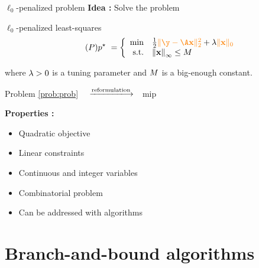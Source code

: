 \documentclass[10pt]{beamer}
\begin{document}
\begin{frame}{$\ell_0$-penalized problem}
  \textbf{Idea :} Solve the problem
  \begin{block}{$\ell_0$-penalized least-squares}
    \begin{equation}
      \label{prob:prob} \tag{\(\mpb\)}
      \optobj \ =
      \left\{
      \begin{array}{rl}
        \min & \tfrac{1}{2} \emphone{\norm{\obs-\dic\pv}{2}^2} + \reg \emphone{\norm{\pv}{0}}\\
        \text{s.t.} & \kvvbar{\pv}_{\infty} \leq \bigM
      \end{array}
      \right.
    \end{equation}
  \end{block}
  where $\lambda > 0$ is a tuning parameter and $M$ is a big-enough constant.

  \pause

  \begin{center}
    Problem \eqref{prob:prob} $\quad \xlongrightarrow{\text{reformulation}} \quad$\glsdesc{mip}
  \end{center}

  \pause

  \textbf{Properties :}
  \begin{itemize}
    \item Quadratic objective
    \item Linear constraints
    \item Continuous and integer variables
    \item Combinatorial problem
    \item Can be addressed with  algorithms
  \end{itemize}
\end{frame}

\section{Branch-and-bound algorithms}
\end{document}
